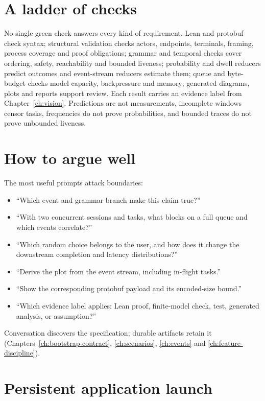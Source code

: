 \section{A ladder of checks}

No single green check answers every kind of requirement. Lean and protobuf check
syntax; structural validation checks actors, endpoints, terminals, framing,
process coverage and proof obligations; grammar and temporal checks cover
ordering, safety, reachability and bounded liveness; probability and dwell
reducers predict outcomes and event-stream reducers estimate them; queue and
byte-budget checks model capacity, backpressure and memory; generated diagrams,
plots and reports support review. Each result carries an evidence label from
Chapter~\ref{ch:vision}. Predictions are not measurements, incomplete windows
censor tasks, frequencies do not prove probabilities, and bounded traces do not
prove unbounded liveness.

\section{How to argue well}

The most useful prompts attack boundaries:

\begin{itemize}
  \item ``Which event and grammar branch make this claim true?''
  \item ``With two concurrent sessions and tasks, what blocks on a full queue
        and which events correlate?''
  \item ``Which random choice belongs to the user, and how does it change the
        downstream completion and latency distributions?''
  \item ``Derive the plot from the event stream, including in-flight tasks.''
  \item ``Show the corresponding protobuf payload and its encoded-size bound.''
  \item ``Which evidence label applies: Lean proof, finite-model check, test,
        generated analysis, or assumption?''
\end{itemize}

Conversation discovers the specification; durable artifacts retain it
(Chapters~\ref{ch:bootstrap-contract}, \ref{ch:scenarios}, \ref{ch:events} and
\ref{ch:feature-discipline}).

\section{Persistent application launch}

